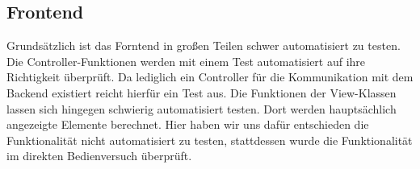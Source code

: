 \subsection{Frontend}
Grundsätzlich ist das Forntend in großen Teilen schwer automatisiert zu testen.
Die Controller-Funktionen werden mit einem Test automatisiert auf ihre Richtigkeit überprüft.
Da lediglich ein Controller für die Kommunikation mit dem Backend existiert reicht hierfür ein Test aus.
Die Funktionen der View-Klassen lassen sich hingegen schwierig automatisiert testen.
Dort werden hauptsächlich angezeigte Elemente berechnet.
Hier haben wir uns dafür entschieden die Funktionalität nicht automatisiert zu testen, stattdessen wurde die Funktionalität im direkten Bedienversuch überprüft.

